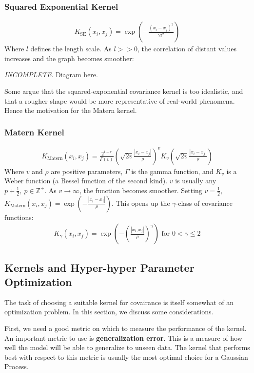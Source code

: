\documentclass[paper=a4, fontsize=12pt]{scrartcl} %
\numberwithin{equation}{section} %
\numberwithin{figure}{section} %
\numberwithin{table}{section} %
\begin{document}
\subsubsection{Squared Exponential Kernel}
\begin{align*}
    K_{\text{SE}}(x_i, x_j) = \exp \left( -\frac{(x_i - x_j)^2}{2l^2} \right)
\end{align*}
Where $l$ defines the length scale. As $l >> 0$, the correlation of distant values increases and the graph becomes smoother:

\textit{INCOMPLETE}. Diagram here.

Some argue that the squared-exponential covariance kernel is too idealistic, and that a rougher shape would be more representative of real-world phenomena. Hence the motivation for the Matern kernel.

\subsubsection{Matern Kernel}
\begin{align*}
    K_{\text{Matern}}(x_i, x_j) = \frac{2^{1-v}}{\Gamma(v)} \left( \sqrt{2v} \frac{|x_i - x_j|}{\rho} \right)^v K_v \left( \sqrt{2v} \frac{|x_i - x_j|}{\rho} \right)
\end{align*}
Where $v$ and $\rho$ are positive parameters, $\Gamma$ is the gamma function, and $K_v$ is a Weber function (a Bessel function of the second kind). $v$ is usually any $p + \frac{1}{2},\ p \in \mathbb{Z}^+$.
As $v \rightarrow \infty$, the function becomes smoother. Setting $v = \frac{1}{2}$, $K_{\text{Matern}}(x_i, x_j) = \exp(-\frac{|x_i - x_j|}{\rho})$. This opens up the $\gamma$-class of covariance functions:
\begin{align*}
    K_\gamma (x_i, x_j) = \exp \left( -\left(\frac{|x_i, x_j|}{\rho} \right)^\gamma \right) \text{ for } 0 < \gamma \leq 2
\end{align*}

\subsection{Kernels and Hyper-hyper Parameter Optimization}
The task of choosing a suitable kernel for covairance is itself somewhat of an optimization problem. In this section, we discuss some considerations.

First, we need a good metric on which to measure the performance of the kernel. An important metric to use is \textbf{generalization error}. This is a measure of how well 
the model will be able to generalize to unseen data. The kernel that performs best with respect to this metric is usually the most optimal choice for a Gaussian Process.
\end{document}
